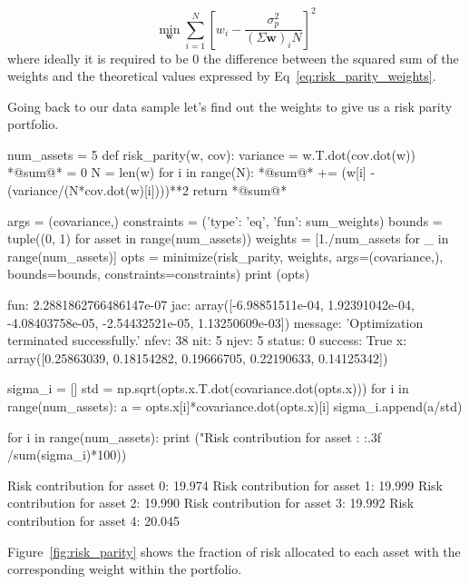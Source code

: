 \begin{equation} 
\underset{\mathbf{w}}{\min } \sum _{i=1}^{N}\left[w_{i}-{\frac {\sigma_p^{2}}{(\Sigma \mathbf{w})_{i}N}}\right]^{2} 
\end{equation}
\noindent
where ideally it is required to be 0 the difference between the squared sum of the weights and the theoretical values expressed by Eq~\ref{eq:risk_parity_weights}.

Going back to our data sample let's find out the weights to give us a risk parity portfolio.

\begin{ipython}
num_assets = 5
def risk_parity(w, cov):
    variance = w.T.dot(cov.dot(w))
    *@sum@* = 0
    N = len(w)
    for i in range(N):
        *@sum@* += (w[i] - (variance/(N*cov.dot(w)[i])))**2
    return *@sum@*
	
args = (covariance,)
constraints = ({'type': 'eq', 'fun': sum_weights})
bounds = tuple((0, 1) for asset in range(num_assets))
weights = [1./num_assets for _ in range(num_assets)]
opts = minimize(risk_parity, weights, args=(covariance,),
                bounds=bounds, constraints=constraints)
print (opts)
\end{ipython}
\begin{ioutput}
    fun: 2.2881862766486147e-07
    jac: array([-6.98851511e-04,  1.92391042e-04, -4.08403758e-05, 
                -2.54432521e-05,  1.13250609e-03])
message: 'Optimization terminated successfully.'
   nfev: 38
    nit: 5
   njev: 5
 status: 0
success: True
x: array([0.25863039, 0.18154282, 0.19666705, 0.22190633, 
          0.14125342])
\end{ioutput}

\begin{ipython}
sigma_i = []
std = np.sqrt(opts.x.T.dot(covariance.dot(opts.x)))
for i in range(num_assets):
    a = opts.x[i]*covariance.dot(opts.x)[i]
	sigma_i.append(a/std)
	
for i in range(num_assets):
    print ("Risk contribution for asset {}: {:.3f}%
                                                            /sum(sigma_i)*100))
\end{ipython}
\begin{ioutput}
Risk contribution for asset 0: 19.974%
Risk contribution for asset 1: 19.999%
Risk contribution for asset 2: 19.990%
Risk contribution for asset 3: 19.992%
Risk contribution for asset 4: 20.045%
\end{ioutput}

Figure~\ref{fig:risk_parity} shows the fraction of risk allocated to each asset with the corresponding weight within the portfolio.

